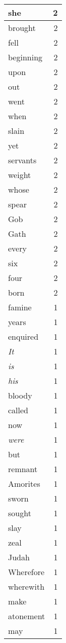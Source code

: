 \begin{center}
\begin{longtable}{l|r}
she & 2 \\ \hline
brought & 2 \\ \hline
fell & 2 \\ \hline
beginning & 2 \\ \hline
upon & 2 \\ \hline
out & 2 \\ \hline
went & 2 \\ \hline
when & 2 \\ \hline
slain & 2 \\ \hline
yet & 2 \\ \hline
servants & 2 \\ \hline
weight & 2 \\ \hline
whose & 2 \\ \hline
spear & 2 \\ \hline
Gob & 2 \\ \hline
Gath & 2 \\ \hline
every & 2 \\ \hline
six & 2 \\ \hline
four & 2 \\ \hline
born & 2 \\ \hline
famine & 1 \\ \hline
years & 1 \\ \hline
enquired & 1 \\ \hline
\emph{It} & 1 \\ \hline
\emph{is} & 1 \\ \hline
\emph{his} & 1 \\ \hline
bloody & 1 \\ \hline
called & 1 \\ \hline
now & 1 \\ \hline
\emph{were} & 1 \\ \hline
but & 1 \\ \hline
remnant & 1 \\ \hline
Amorites & 1 \\ \hline
sworn & 1 \\ \hline
sought & 1 \\ \hline
slay & 1 \\ \hline
zeal & 1 \\ \hline
Judah & 1 \\ \hline
Wherefore & 1 \\ \hline
wherewith & 1 \\ \hline
make & 1 \\ \hline
atonement & 1 \\ \hline
may & 1 \\ \hline

\end{longtable}
\end{center}
